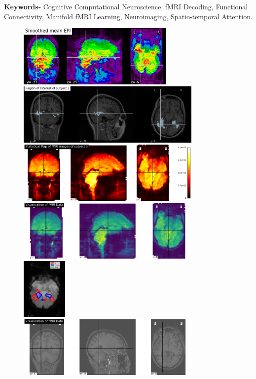\documentclass[10pt, twocolumn, letterpaper]{article}
\begin{document}
\textbf{Keywords-} Cognitive Computational Neuroscience, fMRI Decoding, Functional Connectivity, Manifold fMRI Learning, Neuroimaging, Spatio-temporal Attention.


\begin{figure}
    \includegraphics[width=.50\linewidth, height=3cm,  valign=c]{images/epi.png}
    \includegraphics[width=.50\linewidth, height=3cm,  valign=c]{images/roi.png}
    \includegraphics[width=.50\linewidth, height=3cm,  valign=c, valign=c]{images/stats_map.png}
    \includegraphics[width=.50\linewidth, height=3cm,  valign=c, valign=c, valign=c]{images/fMRI.png}
    \\[\smallskipamount]
    \includegraphics[width=.50\linewidth, height=3cm,  valign=c]{images/pretty_brain_response.png}
    \includegraphics[width=.50\linewidth, height=3cm,  valign=c]{images/anat.png}

\end{figure}
\end{document}
